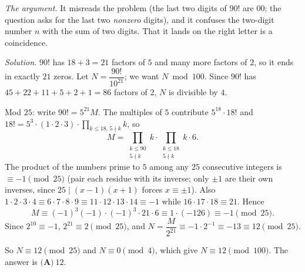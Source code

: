 \emph{The argument.} It misreads the problem (the last two digits of $90!$ are $00$; the question asks for the last two \emph{nonzero} digits), and it confuses the two-digit number $n$ with the sum of two digits. That it lands on the right letter is a coincidence.

\emph{Solution.} $90!$ has $18+3=21$ factors of $5$ and many more factors of $2$, so it ends in exactly $21$ zeros. Let $N=\dfrac{90!}{10^{21}}$; we want $N\bmod100$. Since $90!$ has $45+22+11+5+2+1=86$ factors of $2$, $N$ is divisible by $4$.

Mod $25$: write $90!=5^{21}M$. The multiples of $5$ contribute $5^{18}\cdot18!$ and $18!=5^3\cdot(1\cdot2\cdot3)\cdot\prod_{k\le18,\,5\nmid k}k$, so
\[M=\prod_{\substack{k\le90\\5\nmid k}}k\cdot\prod_{\substack{k\le18\\5\nmid k}}k\cdot6.\]
The product of the numbers prime to $5$ among any $25$ consecutive integers is $\equiv-1\pmod{25}$ (pair each residue with its inverse; only $\pm1$ are their own inverses, since $25\mid(x-1)(x+1)$ forces $x\equiv\pm1$). Also $1\cdot2\cdot3\cdot4\equiv6\cdot7\cdot8\cdot9\equiv11\cdot12\cdot13\cdot14\equiv-1$ while $16\cdot17\cdot18\equiv21$. Hence
\[M\equiv(-1)^3(-1)\cdot(-1)^3\cdot21\cdot6\equiv1\cdot(-126)\equiv-1\pmod{25}.\]
Since $2^{10}\equiv-1$, $2^{21}\equiv2\pmod{25}$, and $N=\dfrac{M}{2^{21}}\equiv-1\cdot2^{-1}\equiv-13\equiv12\pmod{25}$.

So $N\equiv12\pmod{25}$ and $N\equiv0\pmod4$, which give $N\equiv12\pmod{100}$. The answer is $\boxed{\textbf{(A)}\ 12}$.
